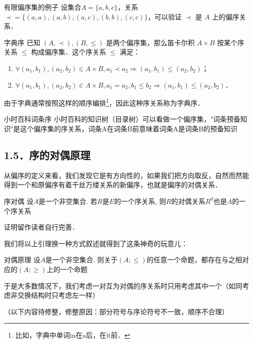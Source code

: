 \begin{example}{有限偏序集的例子}
设集合$A = \{a,b,c\}$，关系$\prec\!= \{(a,a),(a,b),(a,c),(b,b),(c,c)\}$，可以验证 $\prec$ 是 $A$ 上的偏序关系．
\end{example}

\begin{example}{字典序}\label{OrdRel_ex1}
已知 $(A,\prec),(B,\leq)$ 是两个偏序集，那么笛卡尔积 $A\times B$ 按某个序关系 $\leqslant$ 构成偏序集．这个序关系 $\leqslant$ 满足：
\begin{enumerate}
\item $\forall(a_1,b_1),(a_2,b_2) \in A\times B, a_1\prec a_2 \Rightarrow (a_1,b_1)\leqslant(a_2,b_2)$；
\item $\forall(a_1,b_1),(a_2,b_2) \in A\times B, a_1=a_2, b_1\leq b_2 \Rightarrow (a_1,b_1) \leqslant (a_2, b_2)$．
\end{enumerate}

由于字典通常按照这样的顺序编排\footnote{比如，字典中单词in在a后，在it前．}，因此这种序关系称为字典序．
\end{example}

\begin{example}{小时百科词条序}
小时百科的知识树（目录树）可以看做一个偏序集，"词条预备知识"是这个偏序集的序关系，词条A在词条B前意味着词条A是词条B的预备知识
\end{example}

\subsection{1.5．序的对偶原理}
从偏序的定义来看，我们发现它是有方向性的，如果我们把方向取反，自然而然能得到一个和原偏序有着千丝万缕关系的新偏序，也就是偏序的对偶关系．

\begin{lemma}{序对偶}
  设$A$是一个非空集合. 若$R$是$E$的一个序关系, 则$R$的对偶关系$R^{d}$也是$A$的一个序关系
\end{lemma}
证明留作读者自行完善．

我们将以上引理换一种方式叙述就得到了这条神奇的玩意儿：
\begin{theorem}{对偶原理}
 设$A$是一个非空集合. 则关于$(A;\leq)$的任意一个命题，都存在与之相对应的$(A;\geq)$上的一个命题
\end{theorem}

于是大多数情况下，我们考虑一对互为对偶的序关系时只用考虑其中一个（如同考虑非交换结构时只考虑左一样）

（以下内容待修整，修整原因：部分符号与序论符号不一致，顺序不合理）
